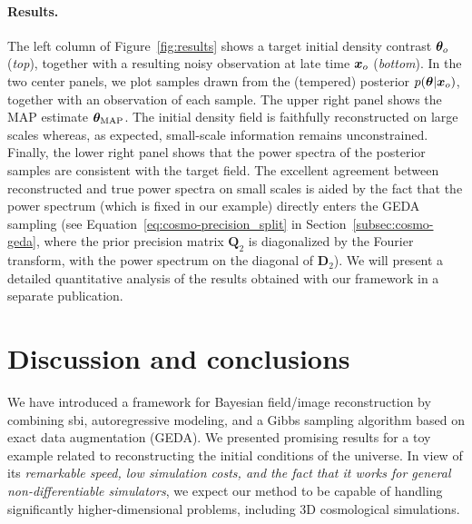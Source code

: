 \paragraph{Results.}The left column of Figure~\ref{fig:results} shows a target initial density contrast ${\bm{\theta}}_o$ ({\it top}), together with a resulting noisy observation at late time ${\bm{x}}_o$ ({\it bottom}). In the two center panels, we plot samples drawn from the (tempered) posterior $p(\bm{\theta} | {\bm{x}}_o)$, together with an observation of each sample. The upper right panel shows the MAP estimate ${\bm{\theta}}_{\text{MAP}}$. The initial density field is faithfully reconstructed on large scales whereas, as expected, small-scale information remains unconstrained. Finally, the lower right panel shows that the power spectra of the posterior samples are consistent with the target field. The excellent agreement between reconstructed and true power spectra on small scales is aided by the fact that the power spectrum (which is fixed in our example) directly enters the GEDA sampling (see Equation~\ref{eq:cosmo-precision_split} in Section~\ref{subsec:cosmo-geda}, where the prior precision matrix ${\bm Q}_2$ is diagonalized by the Fourier transform, with the power spectrum on the diagonal of ${\bm D}_2$). We will present a detailed quantitative analysis of the results obtained with our framework in a separate publication.

\section{Discussion and conclusions} \label{sec:cosmo-conc}
We have introduced a framework for Bayesian field/image reconstruction by combining \gls*{sbi}, autoregressive modeling, and a Gibbs sampling algorithm based on exact data augmentation (GEDA). We presented promising results for a toy example related to reconstructing the initial conditions of the universe. In view of its \textit{remarkable speed, low simulation costs, and the fact that it works for general non-differentiable simulators}, we expect our method to be capable of handling significantly higher-dimensional problems, including 3D cosmological simulations.

